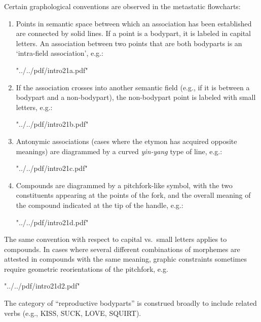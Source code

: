 Certain graphological conventions are observed in the metastatic flowcharts:

\begin{enumerate}
\item Points in semantic space between which an association has been established
are connected by solid lines. If a point is a bodypart, it is labeled in
capital letters. An association between two points that are both bodyparts is
an ‘intra-field association’, e.g.:

\XeTeXpdffile "../../pdf/intro21a.pdf"

\item If the association crosses into another semantic field (e.g., if it is between a bodypart and a non-bodypart), the
non-bodypart point is labeled with small letters, e.g.:

\XeTeXpdffile "../../pdf/intro21b.pdf" 

\item Antonymic associations (cases where the etymon has acquired opposite
meanings) are diagrammed by a curved \textit{yin-yang} type of line, e.g.:

\XeTeXpdffile "../../pdf/intro21c.pdf"

\item Compounds are diagrammed by a pitchfork-like symbol, with the two
constituents appearing at the points of the fork, and the overall meaning of the
compound indicated at the tip of the handle, e.g.:

\XeTeXpdffile "../../pdf/intro21d.pdf" 

\end{enumerate}

The same convention with respect to capital vs.\ small letters applies to
compounds. In cases where several different combinations of morphemes are attested in compounds with the same meaning, graphic constraints sometimes require geometric reorientations of the pitchfork, e.g.

\XeTeXpdffile "../../pdf/intro21d2.pdf"

The category of “reproductive bodyparts” is construed broadly to include related verbs (e.g., KISS, SUCK, LOVE, SQUIRT).

